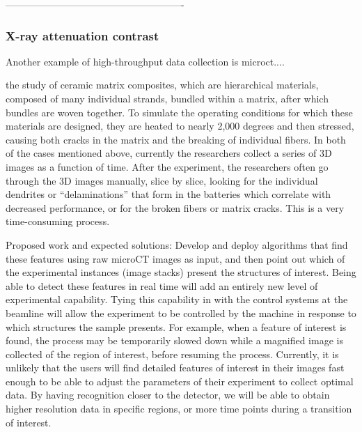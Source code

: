 -------------------------------------------------------
\subsubsection{X-ray attenuation contrast}\label{subsec:microct}
Another example of high-throughput data collection is microct....


the study of ceramic matrix composites, which are hierarchical materials, composed of many individual strands, bundled within a matrix, after which bundles are woven together. To simulate the operating conditions for which these materials are designed, they are heated to nearly 2,000 degrees and then stressed, causing both cracks in the matrix and the breaking of individual fibers. In both of the cases mentioned above, currently the researchers collect a series of 3D images as a function of time. After the experiment, the researchers often go through the 3D images manually, slice by slice, looking for the individual dendrites or “delaminations” that form in the batteries which correlate with decreased performance, or for the broken fibers or matrix cracks. This is a very time-consuming process.

Proposed work and expected solutions: Develop and deploy algorithms that find these features using raw microCT images as input, and then point out which of the experimental instances (image stacks) present the structures of interest. Being able to detect these features in real time will add an entirely new level of experimental capability. Tying this capability in with the control systems at the beamline will allow the experiment to be controlled by the machine in response to which structures the sample presents. For example, when a feature of interest is found, the process may be temporarily slowed down while a magnified image is collected of the region of interest, before resuming the process. Currently, it is unlikely that the users will find detailed features of interest in their images fast enough to be able to adjust the parameters of their experiment to collect optimal data. By having recognition closer to the detector, we will be able to obtain higher resolution data in specific regions, or more time points during a transition of interest.


\cite{IEEEBigData:2014}


